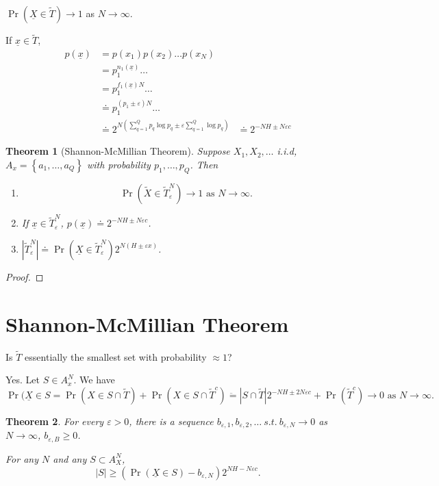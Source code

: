 \documentclass{report}
\newcommand{\st}{\ s.t.\ }
\newcommand{\set}[1]{\left\lbrace #1 \right\rbrace}
\newtheorem{theorem}{Theorem}[section]
\theoremstyle{definition}
\theoremstyle{remark}
\numberwithin{equation}{section}
\begin{document}
$\Pr(\underline{X} \in \tilde{T}) \to 1$ as $N \to \infty$.

If $\underline{x} \in \tilde{T}$, \begin{align*}
  p(\underline{x}) & = p(x_1)p(x_2)\ldots p(x_N) \\
  & = p_1^{n_1(\underline{x})}\ldots \\
  & = p_1^{f_1(\underline{x})N}\ldots \\
  & \doteq p_1^{(p_1 \pm \varepsilon)N}\ldots \\
  & \doteq 2^{N\left(\sum_{q=1}^Q p_q\log p_q \pm \varepsilon \sum_{q=1}^Q\log p_q\right)}
  & \doteq 2^{-NH \pm N\varepsilon c}
\end{align*}

\begin{theorem}[Shannon-McMillian Theorem]
  Suppose $X_1, X_2, \ldots$ i.i.d, $A_x = \set{a_1, \ldots, a_Q}$ with probability $p_1, \ldots, p_Q$. Then \begin{enumerate}
    \item  \[ \Pr(\tilde{X} \in \tilde{T}_\varepsilon^N) \to 1 \text{ as } N \to \infty. \]
    \item If $\underline{x} \in \tilde{T}_\varepsilon^N$, $p(\underline{x}) \doteq 2^{-NH \pm N\varepsilon c}$.
    \item $\left|\tilde{T}_\varepsilon^N\right| \doteq \Pr(\underline{X} \in \tilde{T}_\varepsilon^N)2^{N(H \pm \varepsilon x)}$.
  \end{enumerate}
\end{theorem}
\begin{proof}
\end{proof}

\section{Shannon-McMillian Theorem}
Is $\tilde{T}$ essentially the smallest set with probability $\approx 1$?

Yes. Let $S \in A_x^N$. We have \[
  \Pr(\underline{X} \in S = \Pr(X \in S \cap \tilde{T}) + \Pr(X \in S \cap \tilde{T}^c) \ddot{=} |S \cap \tilde{T}|2^{-NH \pm 2N\varepsilon c} + \Pr(\tilde{T}^c) \to 0 \text{ as } N \to \infty.  
\]

\begin{theorem}
  For every $\varepsilon > 0$, there is a sequence $b_{\varepsilon,1}, b_{\varepsilon,2}, \ldots \st b_{\varepsilon, N} \to 0$ as $N \to \infty$, $b_{\varepsilon, B} \geq 0$.

  For any $N$ and any $S \subset A_X^N$, \[
    |S| \geq \left(\Pr(\underline{X}\in S) - b_{\varepsilon, N}\right)2^{NH - N\varepsilon c}.  
  \]
\end{theorem}
\end{document}

